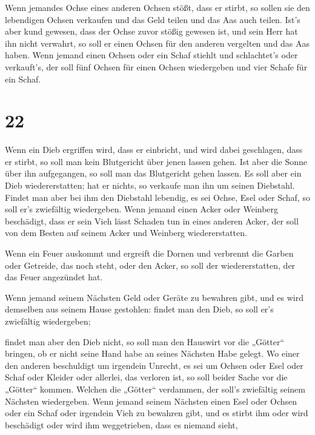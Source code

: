  Wenn jemandes Ochse eines anderen Ochsen stößt, dass er
stirbt, so sollen sie den lebendigen Ochsen verkaufen und das Geld
teilen und das Aas auch teilen.  Ist's aber kund gewesen,
dass der Ochse zuvor stößig gewesen ist, und sein Herr hat ihn nicht
verwahrt, so soll er einen Ochsen für den anderen vergelten und das Aas
haben.  Wenn jemand einen Ochsen oder ein Schaf stiehlt
und schlachtet's oder verkauft's, der soll fünf Ochsen für einen Ochsen
wiedergeben und vier Schafe für ein Schaf.

\hypertarget{section-21}{%
\section{22}\label{section-21}}

 Wenn ein Dieb ergriffen wird, dass er einbricht, und wird
dabei geschlagen, dass er stirbt, so soll man kein Blutgericht über
jenen lassen gehen.  Ist aber die Sonne über ihn
aufgegangen, so soll man das Blutgericht gehen lassen. Es soll aber ein
Dieb wiedererstatten; hat er nichts, so verkaufe man ihn um seinen
Diebstahl.  Findet man aber bei ihm den Diebstahl
lebendig, es sei Ochse, Esel oder Schaf, so soll er's zwiefältig
wiedergeben.  Wenn jemand einen Acker oder Weinberg
beschädigt, dass er sein Vieh lässt Schaden tun in eines anderen Acker,
der soll von dem Besten auf seinem Acker und Weinberg wiedererstatten.

 Wenn ein Feuer auskommt und ergreift die Dornen und
verbrennt die Garben oder Getreide, das noch steht, oder den Acker, so
soll der wiedererstatten, der das Feuer angezündet hat.

 Wenn jemand seinem Nächsten Geld oder Geräte zu bewahren
gibt, und es wird demselben aus seinem Hause gestohlen: findet man den
Dieb, so soll er's zwiefältig wiedergeben;

 findet man aber den Dieb nicht, so soll man den Hauswirt
vor die „Götter`` bringen, ob er nicht seine Hand habe an seines
Nächsten Habe gelegt.  Wo einer den anderen beschuldigt um
irgendein Unrecht, es sei um Ochsen oder Esel oder Schaf oder Kleider
oder allerlei, das verloren ist, so soll beider Sache vor die „Götter``
kommen. Welchen die „Götter`` verdammen, der soll's zwiefältig seinem
Nächsten wiedergeben.  Wenn jemand seinem Nächsten einen
Esel oder Ochsen oder ein Schaf oder irgendein Vieh zu bewahren gibt,
und es stirbt ihm oder wird beschädigt oder wird ihm weggetrieben, dass
es niemand sieht,

